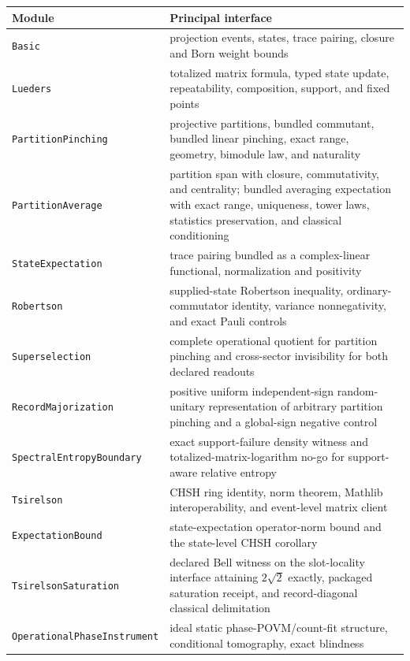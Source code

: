 \documentclass[11pt]{article}
\renewcommand{\_}{\textunderscore\allowbreak}
\theoremstyle{remark}
\begin{document}
\begin{table}[ht]
\centering
\small
\begin{tabular}{@{}L{3.0cm}L{9.2cm}@{}}
\toprule
Module & Principal interface \\
\midrule
\texttt{Basic} & projection events, states, trace pairing, closure and Born
weight bounds \\
\texttt{Lueders} & totalized matrix formula, typed state update, repeatability,
composition, support, and fixed points \\
\texttt{Partition\allowbreak Pinching} & projective partitions, bundled commutant,
bundled linear pinching, exact range, geometry, bimodule law, and naturality \\
\texttt{PartitionAverage} & partition span with closure, commutativity, and
centrality; bundled averaging expectation with exact range, uniqueness, tower
laws, statistics preservation, and classical conditioning \\
\texttt{StateExpectation} & trace pairing bundled as a complex-linear
functional, normalization and positivity \\
\texttt{Robertson} & supplied-state Robertson inequality, ordinary-commutator
identity, variance nonnegativity, and exact Pauli controls \\
\texttt{Superselection} & complete operational quotient for partition
pinching and cross-sector invisibility for both declared readouts \\
\texttt{Record\allowbreak Majorization} & positive uniform independent-sign
random-unitary representation of arbitrary partition pinching and a
global-sign negative control \\
\texttt{Spectral\allowbreak Entropy\allowbreak Boundary} & exact support-failure density witness and
totalized-matrix-logarithm no-go for support-aware relative entropy \\
\texttt{Tsirelson} & CHSH ring identity, norm theorem, Mathlib interoperability,
and event-level matrix client \\
\texttt{ExpectationBound} & state-expectation operator-norm bound and the
state-level CHSH corollary \\
\texttt{Tsirelson\allowbreak Saturation} & declared Bell witness on the
slot-locality interface attaining $2\sqrt2$ exactly, packaged saturation
receipt, and record-diagonal classical delimitation \\
\texttt{Operational\allowbreak Phase\allowbreak Instrument} & ideal static
phase-POVM/count-fit structure, conditional tomography, exact blindness

\end{tabular}
\end{table}
\end{document}
